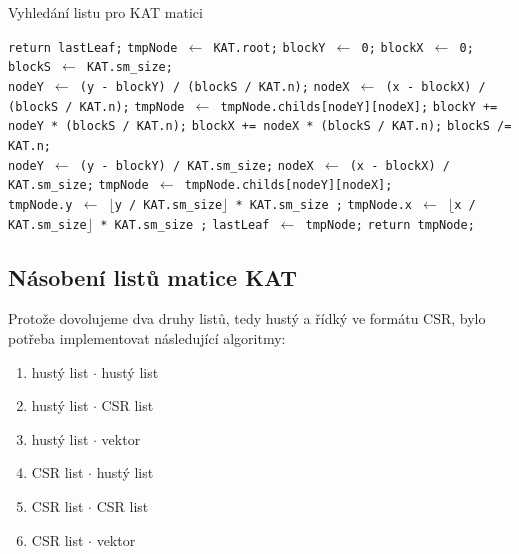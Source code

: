 \label{alg:kat-create}
\begin{algorithm}[htb]
	\caption{Vyhledání listu pro KAT matici}\label{kat-create}
	\begin{algorithmic}[1]
			\State \texttt{return lastLeaf;}
		\EndIf
		\State \texttt{tmpNode $\gets$ KAT.root;}
		\State \texttt{blockY $\gets$ 0;}
		\State \texttt{blockX $\gets$ 0;}
		\State \texttt{blockS $\gets$ KAT.sm\_size;}
		\\
			\State \texttt{nodeY $\gets$ (y - blockY) / (blockS / KAT.n);}
			\State \texttt{nodeX $\gets$ (x - blockX) / (blockS / KAT.n);}
			\State \texttt{tmpNode $\gets$ tmpNode.childs[nodeY][nodeX];}
			\State \texttt{blockY += nodeY * (blockS / KAT.n);}
			\State \texttt{blockX += nodeX * (blockS / KAT.n);}
			\State \texttt{blockS /= KAT.n;}
		\EndWhile
		\\
		\State \texttt{nodeY $\gets$ (y - blockY) / KAT.sm\_size;}
		\State \texttt{nodeX $\gets$ (x - blockX) / KAT.sm\_size;}
		\State \texttt{tmpNode $\gets$ tmpNode.childs[nodeY][nodeX];} 	
		\\
		\State \texttt{tmpNode.y $\gets$ $\lfloor$y / KAT.sm\_size$\rfloor$ * KAT.sm\_size ;}
		\State \texttt{tmpNode.x $\gets$ $\lfloor$x / KAT.sm\_size$\rfloor$ * KAT.sm\_size ;}
		\State \texttt{lastLeaf $\gets$ tmpNode;}
		\State \texttt{return tmpNode;}
		\EndProcedure
	\end{algorithmic}
\end{algorithm}

\subsection{Násobení listů matice KAT}

Protože dovolujeme dva druhy listů, tedy hustý a řídký ve formátu CSR, bylo potřeba implementovat následující algoritmy:

\begin{enumerate}
  \item hustý list $\cdot$ hustý list
  \item hustý list $\cdot$ CSR list
  \item hustý list $\cdot$ vektor
  \item CSR list $\cdot$ hustý list
  \item CSR list $\cdot$ CSR list
  \item CSR list $\cdot$ vektor
\end{enumerate}

